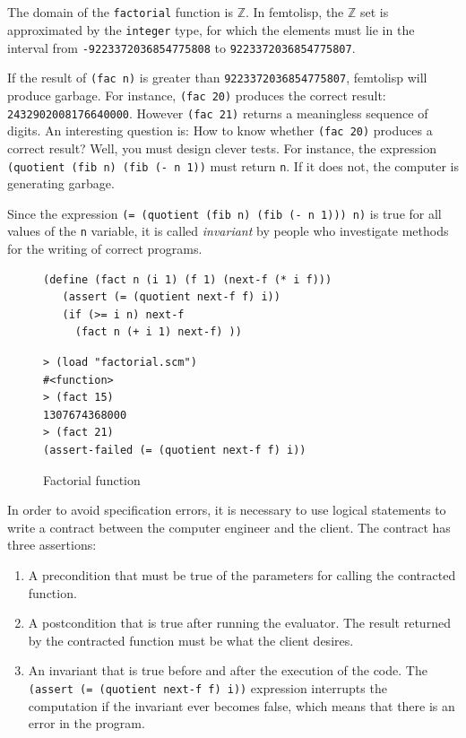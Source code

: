 \documentclass[a4paper,12pt]{book}
\newenvironment{fmpage}[1]
               {\begin{lrbox}{\fmbox}\begin{minipage}{#1}}
               {\end{minipage}\end{lrbox}\fbox{\usebox{\fmbox}}}
\begin{document}
\verb||\\
\verb||\\
The domain of the \verb|factorial| function is $\mathbb{Z}$.
In femtolisp, the $\mathbb{Z}$ set is approximated
by the \verb|integer| type, for which the elements
must lie in the interval from \verb|-9223372036854775808|
to \verb|9223372036854775807|.

If the result of \verb|(fac n)| is greater
than  \verb|9223372036854775807|,
femtolisp will produce garbage.
For instance, \verb|(fac 20)| produces the
correct result: \verb|2432902008176640000|.
However \verb|(fac 21)| returns a meaningless
sequence of digits.
An interesting question is: How to know
whether \verb|(fac 20)| produces a correct
result? Well, you must design clever tests.
For instance, the expression
\verb|(quotient (fib n) (fib (- n 1))|
must return \verb|n|. If it does not,
the computer is generating garbage.

Since the
expression \verb|(= (quotient (fib n) (fib (- n 1))) n)|
is true for all values of the \verb|n| variable,
it is called {\em invariant} by people
who investigate methods for the writing of correct
programs.

\begin{figure}[!h]
\begin{fmpage}{0.8\linewidth}
\begin{verbatim}
(define (fact n (i 1) (f 1) (next-f (* i f)))
   (assert (= (quotient next-f f) i))
   (if (>= i n) next-f
     (fact n (+ i 1) next-f) ))
\end{verbatim}
\end{fmpage}

\begin{fmpage}{0.8\linewidth}
\begin{verbatim}
> (load "factorial.scm")
#<function>
> (fact 15)
1307674368000
> (fact 21)
(assert-failed (= (quotient next-f f) i))
\end{verbatim}
\end{fmpage}
\caption{Factorial function}
\label{loop-invariant/fact}
\end{figure}

In order to avoid specification errors,
it is necessary to use logical statements
to write a contract between the computer
engineer and the client. The contract has
three assertions:
\begin{enumerate}
\item A precondition that must be true
of the parameters for calling the contracted function.
\item A postcondition that is true after running
  the evaluator. The result returned by the
  contracted function must be what the client desires.
\item An invariant that is
  true before and after the execution of the code.  
The \verb|(assert (= (quotient next-f f) i))|
expression interrupts the computation if
the invariant ever becomes false, which
means that there is an error in the program.
\end{enumerate}
\end{document}

